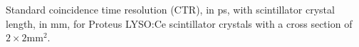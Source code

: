 \label{fig:standardctr} Standard coincidence time resolution (CTR), in ps, with scintillator crystal length, in mm, for Proteus LYSO:Ce scintillator crystals with a cross section of $2\times2$mm$^2$.